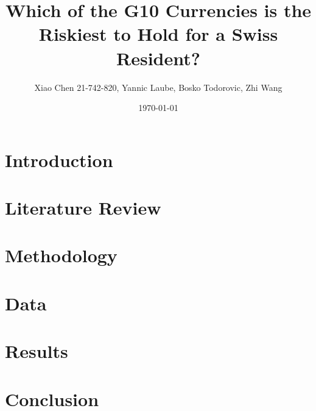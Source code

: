 \documentclass[a4paper, 12pt]{article}
\title{\textbf{Which of the G10 Currencies is the Riskiest to Hold for a Swiss Resident?}}
\author{Xiao Chen 21-742-820, Yannic Laube, Bosko Todorovic, Zhi Wang}
\date{\today}
\begin{document}
\maketitle
\section{Introduction}
\section{Literature Review}
\section{Methodology}
\section{Data}
\section{Results}
\section{Conclusion}
\end{document}
